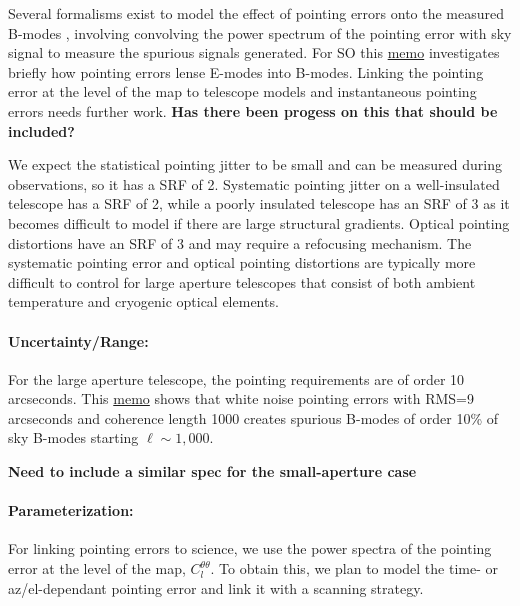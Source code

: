 Several formalisms exist to model the effect of pointing errors onto the measured B-modes \cite{hu03, Shimon_2008}, involving convolving the power spectrum of the pointing error with sky signal to measure the spurious signals generated. For SO this \href{http://simonsobservatory.wdfiles.com/local--files/calandsys-telecon/eb_leakage_from_pointing_error.pdf?ukey=61f26ef33e8439a4e7096ab52c54c523066a4e35}{memo} investigates briefly how pointing errors lense E-modes into B-modes. Linking the pointing error at the level of the map to telescope models and instantaneous pointing errors needs further work. \textbf{Has there been progess on this that should be included?}

We expect the statistical pointing jitter to be small and can be measured during observations, so it has a SRF of 2. Systematic pointing jitter on a well-insulated telescope has a SRF of 2, while a poorly insulated telescope has an SRF of 3 as it becomes difficult to model if there are large structural gradients. Optical pointing distortions have an SRF of 3 and may require a refocusing mechanism. The systematic pointing error and optical pointing distortions are typically more difficult to control for large aperture telescopes that consist of both ambient temperature and cryogenic optical elements. 

\paragraph{Uncertainty/Range:}
For the large aperture telescope, the pointing requirements are of order 10 arcseconds.
This \href{http://simonsobservatory.wdfiles.com/local--files/calandsys-telecon/eb_leakage_from_pointing_error.pdf?ukey=61f26ef33e8439a4e7096ab52c54c523066a4e35}{memo} shows that white noise pointing errors with RMS=9 arcseconds and coherence length 1000 creates spurious B-modes of order 10\% of sky B-modes starting $\ell \sim 1,000$.

\textbf{Need to include a similar spec for the small-aperture case}


\paragraph{Parameterization:}
For linking pointing errors to science, we use the power spectra of the pointing error at the level of the map, $C_l^{\theta \theta}$. To obtain this, we plan to model the time- or az/el-dependant pointing error and link it with a scanning strategy.
